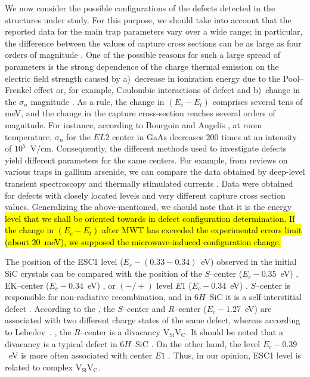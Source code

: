 \documentclass[10pt]{iopart}
\begin{document}
We now consider the possible configurations of the defects detected in the structures under study.
For this purpose, we should take into account that the reported data for the main trap parameters vary over a wide range;
in particular, the difference between the values of capture cross sections can be as large as four orders of magnitude \cite{Pavlovic2000}.
One of the possible reasons for such a large spread of parameters is the strong
dependence of the charge thermal emission on the electric field strength \cite{Bulyarskii2000,Makram} caused by
a)~decrease in ionization energy due to the Pool--Frenkel effect or, for example, Coulombic interactions of defect \cite{Stellmacher} and
b)~change in the $\sigma_n$  magnitude \cite{Bourgoin2001}.
As a rule, the change in $(E_c-E_t)$ comprises several tens of meV, and
the change in the capture cross-section reaches several orders of magnitude.
For instance, according to Bourgoin and Angelis \cite{Bourgoin2001}, at room temperature,
$\sigma_n$  for the $EL2$ center in GaAs decreases 200 times
at an intensity of $10^5$~V/cm.
Consequently, the different methods used to investigate defects yield  different parameters for the same centers.
For example, from reviews on various traps in gallium arsenide,  we can compare the data  obtained by deep-level transient spectroscopy \cite{Bourgoin:GaAs}
and thermally stimulated currents \cite{Pavlovic2000}.
Data were obtained for defects with closely located levels and very different capture cross section values.
Generalizing the above-mentioned, we should note that it is the energy \hl{level that
we shall be oriented towards in defect configuration determination.
If the change in $(E_c-E_t)$ after MWT has exceeded the experimental errors limit (about 20~meV),
we supposed the microwave-induced configuration change.}

The position of the ESC1 level ($E_c-(0.33-0.34)$~eV) observed in the initial SiC crystals can be compared
with the position of the $S$--center ($E_c-0.35$~eV) \cite{Lebed1999En,Anikin1991:2En,Anikin1991:3En},
EK–center ($E_c-0.34$~eV) \cite{Kuznets1997En},
or $(-/+)$ level $E1$ ($E_c-0.34$~eV) \cite{Lebed1999En}.
$S$--center is responsible for non-radiative recombination, and
in 6$H$–SiC it is a self-interstitial defect \cite{Lebed1999En}.
According to the \cite{Anikin1991:2En,Anikin1991:3En},
the $S$--center and $R$--center ($E_c-1.27$~eV) are associated with two different charge states
of the same defect,
whereas according to Lebedev~\etal. \cite{Lebedev2000En},
the $R$--center is a divacancy $\mathrm{V}_\mathrm{Si}\mathrm{V}_\mathrm{C}$.
It should be noted that  a divacancy is a typical defect in 6$H$--SiC \cite{SiCBaran,SiCDavid}.
On the other hand, the level $E_c-0.39$~eV is more often associated with center $E1$ \cite{SiCWei,SiCKoizumi}.
Thus, in our opinion, ESC1 level is related to complex $\mathrm{V}_\mathrm{Si}\mathrm{V}_\mathrm{C}$.
\end{document}
